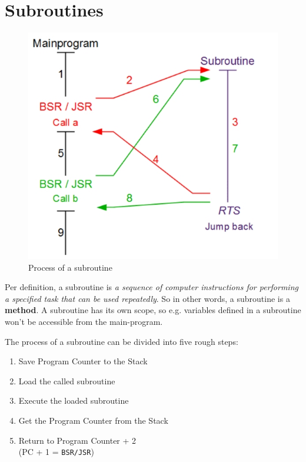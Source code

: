 \documentclass[a4paper, 11pt, nofootinbib]{article}
\newcommand{\code}[1]{\texttt{#1}}
\begin{document}
\section{Subroutines}
\begin{figure}
	\centering
	\includegraphics[keepaspectratio=true,height=15\baselineskip]{subroutine.jpg}
	\caption{Process of a subroutine}
	\label{fig:}
\end{figure}

Per definition, a subroutine is \textit{a sequence of computer instructions for performing a specified task that can be used repeatedly}. So in other words, a subroutine is a \textbf{method}. A subroutine has its own scope, so e.g. variables defined in a subroutine won't be accessible from the main-program. 

The process of a subroutine can be divided into five rough steps:

\begin{enumerate}
	\item Save Program Counter to the Stack
	\item Load the called subroutine
	\item Execute the loaded subroutine
	\item Get the Program Counter from the Stack
	\item Return to Program Counter + 2 \\
	(PC + 1 = \code{BSR/JSR})
\end{enumerate}
\end{document}
